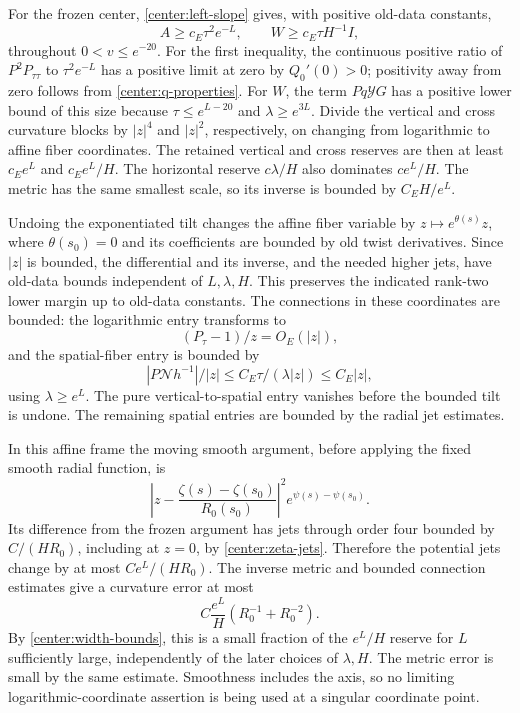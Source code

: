 For the frozen center, \eqref{center:left-slope} gives, with positive old-data constants,
\[
 A\ge c_E\tau^2e^{-L},\qquad
 W\ge c_E\tau H^{-1}I,
\]
throughout $0<v\le e^{-20}$. For the first inequality, the continuous positive ratio of $P^2P_{\tau\tau}$ to $\tau^2e^{-L}$ has a positive limit at zero by $Q_0'(0)>0$; positivity away from zero follows from \eqref{center:q-properties}. For $W$, the term $Pq\mathcal YG$ has a positive lower bound of this size because $\tau\le e^{L-20}$ and $\lambda\ge e^{3L}$. Divide the vertical and cross curvature blocks by $|z|^4$ and $|z|^2$, respectively, on changing from logarithmic to affine fiber coordinates. The retained vertical and cross reserves are then at least $c_Ee^L$ and $c_Ee^L/H$. The horizontal reserve $c\lambda/H$ also dominates $ce^L/H$. The metric has the same smallest scale, so its inverse is bounded by $C_EH/e^L$.

Undoing the exponentiated tilt changes the affine fiber variable by $z\mapsto e^{\theta(s)}z$, where $\theta(s_0)=0$ and its coefficients are bounded by old twist derivatives. Since $|z|$ is bounded, the differential and its inverse, and the needed higher jets, have old-data bounds independent of $L,\lambda,H$. This preserves the indicated rank-two lower margin up to old-data constants. The connections in these coordinates are bounded: the logarithmic entry transforms to
\[
 (P_\tau-1)/z=O_E(|z|),
\]
and the spatial-fiber entry is bounded by
\[
 |P\mathcal Nh^{-1}|/|z|
       \le C_E\tau/(\lambda|z|)\le C_E|z|,
\]
using $\lambda\ge e^L$. The pure vertical-to-spatial entry vanishes before the bounded tilt is undone. The remaining spatial entries are bounded by the radial jet estimates.

In this affine frame the moving smooth argument, before applying the fixed smooth radial function, is
\begin{equation}\label{center:affine-argument}
 \left|z-\frac{\zeta(s)-\zeta(s_0)}{R_0(s_0)}\right|^2
                         e^{\psi(s)-\psi(s_0)}.
\end{equation}
Its difference from the frozen argument has jets through order four bounded by $C/(HR_0)$, including at $z=0$, by \eqref{center:zeta-jets}. Therefore the potential jets change by at most $Ce^L/(HR_0)$. The inverse metric and bounded connection estimates give a curvature error at most
\begin{equation}\label{center:inner-error}
 C\frac{e^L}{H}\left(R_0^{-1}+R_0^{-2}\right).
\end{equation}
By \eqref{center:width-bounds}, this is a small fraction of the $e^L/H$ reserve for $L$ sufficiently large, independently of the later choices of $\lambda,H$. The metric error is small by the same estimate. Smoothness includes the axis, so no limiting logarithmic-coordinate assertion is being used at a singular coordinate point.

